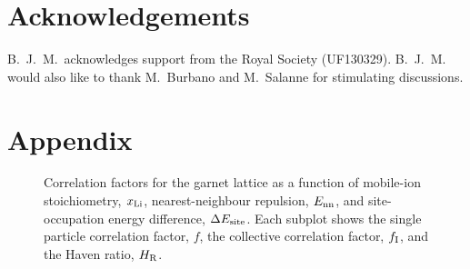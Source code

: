 \documentclass[aps,prb,twocolumn,superscriptaddress,reprint]{revtex4-1}
\newcommand{\xLi}{x_\m{Li}}
\begin{document}
\section{Acknowledgements}
B.\ J.\ M.\ acknowledges support from the Royal Society (UF130329). 
B.\ J.\ M. would also like to thank M.~Burbano and M.~Salanne for stimulating discussions.

\section{Appendix}

\renewcommand{\thefigure}{A\arabic{figure}}
\setcounter{figure}{0}

\begin{figure}[tb]
  \centering
    \caption{\label{fig:correlation_miniplots}Correlation factors for the garnet lattice as a function of mobile-ion stoichiometry, $\xLi$, nearest-neighbour repulsion, $E_{\mathrm{nn}}$, and site-occupation energy difference, $\Delta E_{\mathrm{site}}$. Each subplot shows the single particle correlation factor, $f$, the collective correlation factor, $f_{\mathrm{I}}$, and the Haven ratio, $H_{\mathrm{R}}$.}
\end{figure}
\end{document}
